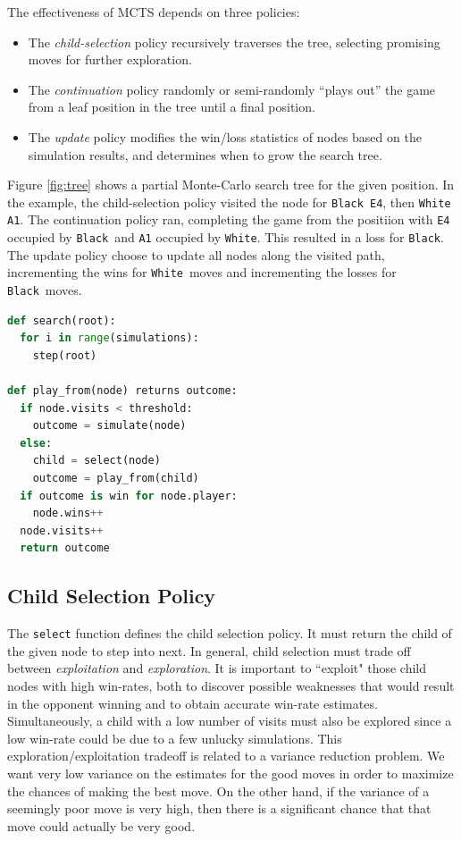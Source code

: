 \documentclass{acm_proc_article-sp}
\newcommand{\black}{\texttt{Black}}
\newcommand{\white}{\texttt{White}}
\begin{document}
The effectiveness of MCTS depends on three policies:
\begin{itemize}
\item{The \emph{child-selection} policy recursively traverses the tree, selecting promising moves for further exploration.}
\item{The \emph{continuation} policy randomly or semi-randomly ``plays out'' the game from a leaf position in the tree until a final position.}
\item{The \emph{update} policy modifies the win/loss statistics of nodes based on the simulation results, and determines when to grow the search tree.}
\end{itemize}
Figure \ref{fig:tree} shows a partial Monte-Carlo search tree for the given position. In the example, the child-selection policy visited the node for \texttt{Black E4}, then \texttt{White A1}. 
The continuation policy ran, completing the game from the positiion with \texttt{E4} occupied by \black\ and \texttt{A1} occupied by \white.
This resulted in a loss for \black. 
The update policy choose to update all nodes along the visited path, incrementing the wins for \white\ moves and incrementing the losses for \black\ moves.

\begin{lstlisting}[float,frame=single,language=Python,caption=MCTS Algorithm Pseudocode]
def search(root):
  for i in range(simulations):
    step(root)

def play_from(node) returns outcome:
  if node.visits < threshold:
    outcome = simulate(node)
  else:
    child = select(node)
    outcome = play_from(child)
  if outcome is win for node.player:
    node.wins++
  node.visits++
  return outcome
\end{lstlisting}

\subsection{Child Selection Policy}
The \texttt{select} function defines the child selection policy. It must return the child of the given node to step into next. 
In general, child selection must trade off between \emph{exploitation} and \emph{exploration}. 
It is important to ``exploit" those child nodes with high win-rates, both
to discover possible weaknesses that would result in the opponent winning and to obtain accurate win-rate estimates. 
Simultaneously, a child with a low number of visits must also be explored since a low win-rate
could be due to a few unlucky simulations.
This exploration/exploitation tradeoff is related to a variance reduction problem.  
We want very low variance on the estimates for the good moves in order to maximize the chances of making the best move.
On the other hand, if the variance of a seemingly poor move is very high, then there is a significant chance that that move
could actually be very good.
\end{document}
